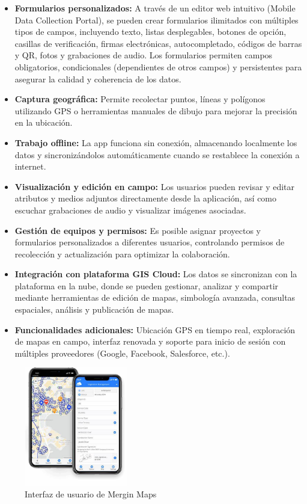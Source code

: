 \documentclass[12pt, a4paper]{book}
\begin{document}
\begin{itemize}
\item \textbf{Formularios personalizados:} A través de un editor web intuitivo (Mobile Data Collection Portal), se pueden crear formularios ilimitados con múltiples tipos de campos, incluyendo texto, listas desplegables, botones de opción, casillas de verificación, firmas electrónicas, autocompletado, códigos de barras y QR, fotos y grabaciones de audio. Los formularios permiten campos obligatorios, condicionales (dependientes de otros campos) y persistentes para asegurar la calidad y coherencia de los datos.

\item \textbf{Captura geográfica:} Permite recolectar puntos, líneas y polígonos utilizando GPS o herramientas manuales de dibujo para mejorar la precisión en la ubicación.

\item \textbf{Trabajo offline:} La app funciona sin conexión, almacenando localmente los datos y sincronizándolos automáticamente cuando se restablece la conexión a internet.

\item \textbf{Visualización y edición en campo:} Los usuarios pueden revisar y editar atributos y medios adjuntos directamente desde la aplicación, así como escuchar grabaciones de audio y visualizar imágenes asociadas.

\item \textbf{Gestión de equipos y permisos:} Es posible asignar proyectos y formularios personalizados a diferentes usuarios, controlando permisos de recolección y actualización para optimizar la colaboración.

\item \textbf{Integración con plataforma GIS Cloud:} Los datos se sincronizan con la plataforma en la nube, donde se pueden gestionar, analizar y compartir mediante herramientas de edición de mapas, simbología avanzada, consultas espaciales, análisis y publicación de mapas.

\item \textbf{Funcionalidades adicionales:} Ubicación GPS en tiempo real, exploración de mapas en campo, interfaz renovada y soporte para inicio de sesión con múltiples proveedores (Google, Facebook, Salesforce, etc.).
\end{itemize}

\begin{figure}[h]
  \centering
  \includegraphics[width=0.4\textwidth]{images/gis_cloud_forms.jpeg}
  \caption{Interfaz de usuario de Mergin Maps}
  \label{fig:giscloudform}
\end{figure}
\end{document}
